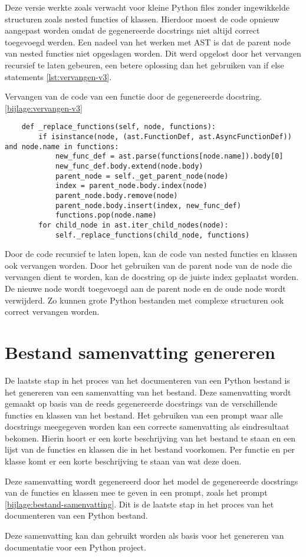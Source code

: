 Deze versie werkte zoals verwacht voor kleine Python files zonder ingewikkelde structuren zoals nested functies of klassen.
Hierdoor moest de code opnieuw aangepast worden omdat de gegenereerde docstrings niet altijd correct toegevoegd werden.
Een nadeel van het werken met AST is dat de parent node van nested functies niet opgeslagen worden.
Dit werd opgelost door het vervangen recursief te laten gebeuren, een betere oplossing dan het gebruiken van if else statements \ref{lst:vervangen-v3}.

\begin{listing}
    \caption[Code voor het vervangen van een docstring v2]{Vervangen van de code van een functie door de gegenereerde docstring. \ref{bijlage:vervangen-v3}}
    \label{lst:vervangen-v3}
    \begin{verbatim}
    def _replace_functions(self, node, functions):
        if isinstance(node, (ast.FunctionDef, ast.AsyncFunctionDef)) and node.name in functions:
            new_func_def = ast.parse(functions[node.name]).body[0]
            new_func_def.body.extend(node.body)
            parent_node = self._get_parent_node(node)
            index = parent_node.body.index(node)
            parent_node.body.remove(node)
            parent_node.body.insert(index, new_func_def)
            functions.pop(node.name)
        for child_node in ast.iter_child_nodes(node):
            self._replace_functions(child_node, functions)
    \end{verbatim}
\end{listing}

Door de code recursief te laten lopen, kan de code van nested functies en klassen ook vervangen worden.
Door het gebruiken van de parent node van de node die vervangen dient te worden, kan de docstring op de juiste index geplaatst worden.
De nieuwe node wordt toegevoegd aan de parent node en de oude node wordt verwijderd.
Zo kunnen grote Python bestanden met complexe structuren ook correct vervangen worden.

\section{Bestand samenvatting genereren}
\label{sec:bestanddocumentatie-samenvatting}
De laatste stap in het proces van het documenteren van een Python bestand is het genereren van een samenvatting van het bestand.
Deze samenvatting wordt gemaakt op basis van de reeds gegenereerde docstrings van de verschillende functies en klassen van het bestand.
Het gebruiken van een prompt waar alle docstrings meegegeven worden kan een correcte samenvatting als eindresultaat bekomen.
Hierin hoort er een korte beschrijving van het bestand te staan en een lijst van de functies en klassen die in het bestand voorkomen.
Per functie en per klasse komt er een korte beschrijving te staan van wat deze doen.

Deze samenvatting wordt gegenereerd door het model de gegenereerde docstrings van de functies en klassen mee te geven in een prompt, zoals het prompt \ref{bijlage:bestand-samenvatting}.
Dit is de laatste stap in het proces van het documenteren van een Python bestand.

Deze samenvatting kan dan gebruikt worden als basis voor het genereren van documentatie voor een Python project.